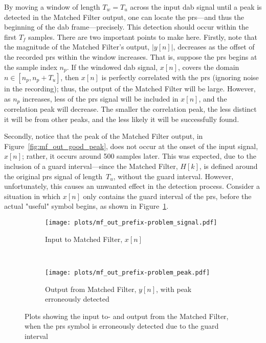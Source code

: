 \documentclass[class=report,11pt,crop=false]{standalone}
\begin{document}
By moving a window of length \(T_w = T_u\) across the input \gls{dab} signal until a peak is detected in the Matched Filter output, one can locate the \gls{prs}---and thus the beginning of the \gls{dab} frame---precisely. This detection should occur within the first \(T_f\) samples. There are two important points to make here. Firstly, note that the magnitude of the Matched Filter's output, \(|y[n]|\), decreases as the offset of the recorded \gls{prs} within the window increases. That is, suppose the \gls{prs} begins at the sample index \(n_p\). If the windowed \gls{dab} signal, \(x[n]\), covers the domain \(n \in [n_p, n_p + T_u]\), then \(x[n]\) is perfectly correlated with the \gls{prs} (ignoring noise in the recording); thus, the output of the Matched Filter will be large. However, as \(n_p\) increases, less of the \gls{prs} signal will be included in \(x[n]\), and the correlation peak will decrease. The smaller the correlation peak, the less distinct it will be from other peaks, and the less likely it will be successfully found.

Secondly, notice that the peak of the Matched Filter output, in Figure~\ref{fig:mf_out_good_peak}, does not occur at the onset of the input signal, \(x[n]\); rather, it occurs around 500 samples later. This was expected, due to the inclusion of a guard interval---since the Matched Filter, \(H[k]\), is defined around the original \gls{prs} signal of length~\(T_u\), without the guard interval. However, unfortunately, this causes an unwanted effect in the detection process. Consider a situation in which \(x[n]\) only contains the guard interval of the \gls{prs}, before the actual "useful" symbol begins, as shown in Figure~\ref{fig:mf_out_prefix-problem_signal}.

\begin{figure}[htbp]
  \centering
  \captionsetup{type=figure}
  \begin{subfigure}[t]{\textwidth}
    \centering
    \captionsetup{type=figure}
    \texttt{[image: plots/mf\_out\_prefix-problem\_signal.pdf]}
    \caption{Input to Matched Filter, \(x[n]\)}
    \label{fig:mf_out_prefix-problem_signal}
  \end{subfigure}%
  \\
  \begin{subfigure}[t]{\textwidth}
    \centering
    \captionsetup{type=figure}
    \texttt{[image: plots/mf\_out\_prefix-problem\_peak.pdf]}
    \caption{Output from Matched Filter, \(y[n]\), with peak erroneously detected}
    \label{fig:mf_out_prefix-problem_peak}
  \end{subfigure}
  \caption{Plots showing the input to- and output from the Matched Filter, when the \gls{prs} symbol is erroneously detected due to the guard interval}
  \label{fig:mf_out_prefix-problem}
\end{figure}
\end{document}
